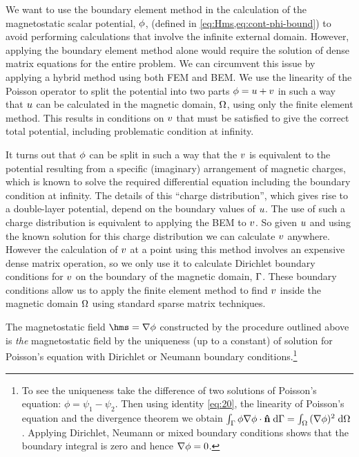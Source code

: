We want to use the boundary element method in the calculation of the magnetostatic scalar potential, $\phi$, (defined in \cref{eq:Hms,eq:cont-phi-bound}) to avoid performing calculations that involve the infinite external domain.
However, applying the boundary element method alone would require the solution of dense matrix equations for the entire problem.
We can circumvent this issue by applying a hybrid method using both FEM and BEM.
We use the linearity of the Poisson operator to split the potential into two parts $\phi = u + v$ in such a way that $u$ can be calculated in the magnetic domain, $\Omega$, using only the finite element method.
This results in conditions on $v$ that must be satisfied to give the correct total potential, including problematic condition at infinity.

It turns out that $\phi$ can be split in such a way that the $v$ is equivalent to the potential resulting from a specific (imaginary) arrangement of magnetic charges, which is known to solve the required differential equation including the boundary condition at infinity.
The details of this ``charge distribution'', which gives rise to a double-layer potential, depend on the boundary values of $u$.
The use of such a charge distribution is equivalent to applying the BEM to $v$.
So given $u$ and using the known solution for this charge distribution we can calculate $v$ anywhere.
However the calculation of $v$ at a point using this method involves an expensive dense matrix operation, so we only use it to calculate Dirichlet boundary conditions for $v$ on the boundary of the magnetic domain, ${\Gamma}$.
These boundary conditions allow us to apply the finite element method to find $v$ inside the magnetic domain $\Omega$ using standard sparse matrix techniques.

The magnetostatic field $ \hms = \grad \phim$ constructed by the procedure outlined above is \emph{the} magnetostatic field by the uniqueness (up to a constant) of solution for Poisson's equation with Dirichlet or Neumann boundary conditions.\footnote{To see the uniqueness take the difference of two solutions of Poisson's equation: $\phi = \psi_1 - \psi_2$.
Then using identity \cref{eq:20}, the linearity of Poisson's equation and the divergence theorem we obtain ${\int_{{\Gamma}} {\phi \nabla \phi \cdot \boldsymbol{\mathrm{\hat{n}}}} {\; \mathrm{{d}}} {{\Gamma}}} = {\int_{\Omega} {(\nabla \phi)^2 } {\; \mathrm{{d}}} {\Omega}}$.
Applying Dirichlet, Neumann or mixed boundary conditions shows that the boundary integral is zero and hence $\nabla \phi = 0$.}

